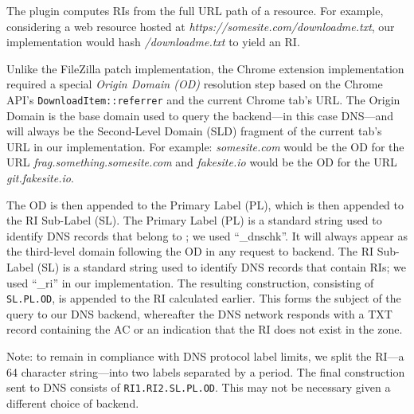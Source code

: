 The plugin computes RIs from the full URL path of a resource. For example,
considering a web resource hosted at
\textit{https://somesite.com/downloadme.txt}, our implementation would hash
\textit{/downloadme.txt} to yield an RI.

Unlike the FileZilla patch implementation, the Chrome extension implementation
required a special \emph{Origin Domain (OD)} resolution step based on the Chrome
API's \texttt{DownloadItem::referrer} and the current Chrome tab's URL. The
Origin Domain is the base domain used to query the backend---in this case
DNS---and will always be the Second-Level Domain (SLD) fragment of the current
tab's URL in our implementation. For example: \emph{somesite.com} would be the
OD for the URL \emph{frag.something.somesite.com} and \emph{fakesite.io} would
be the OD for the URL \emph{git.fakesite.io}.

The OD is then appended to the Primary Label (PL), which is then appended to the
RI Sub-Label (SL). The Primary Label (PL) is a standard string used to identify
DNS records that belong to \SYSTEM{}; we used ``\_dnschk''. It will always
appear as the third-level domain following the OD in any request to backend. The
RI Sub-Label (SL) is a standard string used to identify DNS records that contain
RIs; we used ``\_ri'' in our implementation. The resulting construction,
consisting of \texttt{SL.PL.OD}, is appended to the RI calculated earlier. This
forms the subject of the query to our DNS backend, whereafter the DNS network
responds with a TXT record containing the AC or an indication that the RI does
not exist in the zone.

Note: to remain in compliance with DNS protocol label limits, we split the
RI---a 64 character string---into two labels separated by a period. The final
construction sent to DNS consists of \texttt{RI1.RI2.SL.PL.OD}. This may not be
necessary given a different choice of backend.

